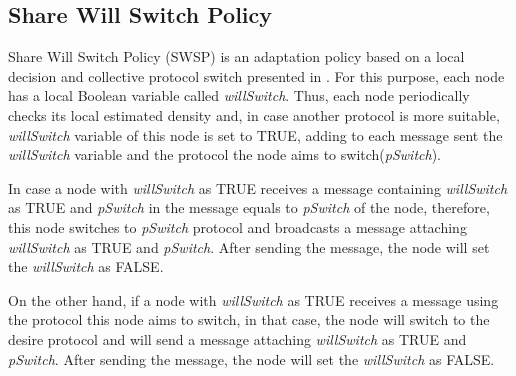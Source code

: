 
\subsection{Share Will Switch Policy}
Share Will Switch Policy (SWSP) is an adaptation policy based on a local decision and collective protocol switch presented in .
For this purpose, each node has a local Boolean variable called \textit{willSwitch}.
Thus, each node periodically checks its local estimated density and, in case another protocol is more suitable, \textit{willSwitch} variable of this node is set to TRUE, adding to each message sent the \textit{willSwitch} variable and the protocol the node aims to switch(\textit{pSwitch}).


In case a node with \textit{willSwitch} as TRUE receives a message containing \textit{willSwitch} as TRUE and \textit{pSwitch} in the message equals to \textit{pSwitch} of the node, therefore, this node switches to \textit{pSwitch} protocol and broadcasts a message attaching \textit{willSwitch} as TRUE and \textit{pSwitch}.
After sending the message, the node will set the \textit{willSwitch} as FALSE.

On the other hand, if a node with \textit{willSwitch} as TRUE receives a message using the protocol this node aims to switch, in that case, the node will switch to the desire protocol and will send a message attaching \textit{willSwitch} as TRUE and \textit{pSwitch}.
After sending the message, the node will set the \textit{willSwitch} as FALSE.





